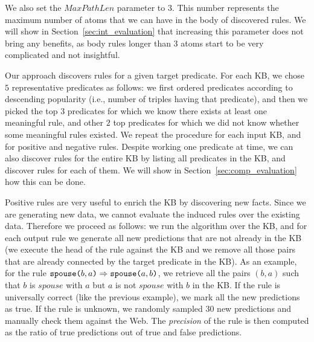 We also set the $MaxPathLen$ parameter to $3$. This number represents the maximum number of atoms that we can have in the body of discovered rules. We will show in Section~\ref{sec:int_evaluation} that increasing this parameter does not bring any benefits, as body rules longer than $3$ atoms start to be very complicated and not insightful.

Our approach discovers rules for a given target predicate. For each KB, we chose $5$ representative predicates as follows: we first ordered predicates according to descending popularity (i.e., number of triples having that predicate), and then we picked the top $3$ predicates for which we know there exists at least one meaningful rule, and other $2$ top predicates for which we did not know whether some meaningful rules existed. We repeat the procedure for each input KB, and for positive and negative rules. Despite working one predicate at time, we can also discover rules for the entire KB by listing all predicates in the KB, and discover rules for each of them. We will show in Section~\ref{sec:comp_evaluation} how this can be done.

Positive rules are very useful to enrich the KB by discovering new facts. Since we are generating new data, we cannot evaluate the induced rules over the existing data. Therefore we proceed as follows: we run the algorithm over the KB, and for each output rule we generate all new predictions that are not already in the KB (we execute the head of the rule against the KB and we remove all those pairs that are already connected by the target predicate in the KB). As an example, for the rule $\texttt{spouse(}b,a\texttt{)} \Rightarrow \texttt{spouse(}a,b\texttt{)}$, we retrieve all the pairs $(b,a)$ such that $b$ is $spouse$ with $a$ but $a$ is not $spouse$ with $b$ in the KB. If the rule is universally correct (like the previous example), we mark all the new predictions as true. If the rule is unknown, we randomly sampled 30 new predictions and manually check them against the Web. The \emph{precision} of the rule is then computed as the ratio of true predictions out of true and false predictions.

